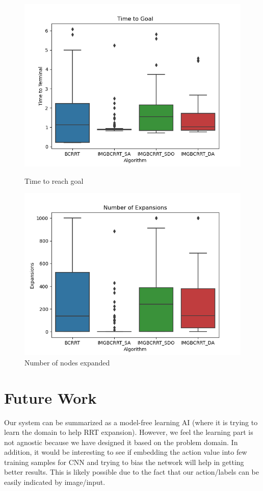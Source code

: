 \documentclass{article}
\begin{document}
\begin{figure}[h]
	\centering
\begin{minipage}{.5\textwidth}
\centering
	\includegraphics[scale=0.45]{TTG1.png}
        \caption{Time to reach goal}
\end{minipage}%
\begin{minipage}{.5\textwidth}
\centering
	\includegraphics[scale=0.45]{Expans1.png}
        \caption{Number of nodes expanded}
\end{minipage}

\end{figure}

\vspace{1cm}
\section{Future Work}
Our system can be summarized as a model-free learning AI (where it is trying to learn the domain to help RRT expansion). However, we feel the learning part is not agnostic because we have designed it based on the problem domain. In addition, it would be interesting to see if embedding the action value into few training samples for CNN and trying to bias the network will help in getting better results. This is likely possible due to the fact that our action/labels can be easily indicated by image/input.
\end{document}

